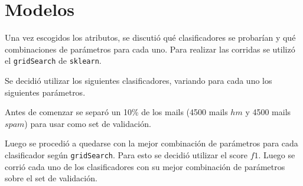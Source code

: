 \section{Modelos}

Una vez escogidos los atributos, se discutió qué clasificadores se probarían y qué combinaciones de parámetros para cada uno. Para realizar las corridas se utilizó el \texttt{gridSearch} de \texttt{sklearn}.

Se decidió utilizar los siguientes clasificadores, variando para cada uno los siguientes parámetros.


Antes de comenzar se separó un 10\% de los mails (4500 mails $hm$ y 4500 mails $spam$) para usar como set de validación.


Luego se procedió a quedarse con la mejor combinación de parámetros para cada clasificador según \texttt{gridSearch}. Para esto se decidió utilizar el score $f1$. Luego se corrió cada uno de los clasificadores con su mejor combinación de parámetros sobre el set de validación.


